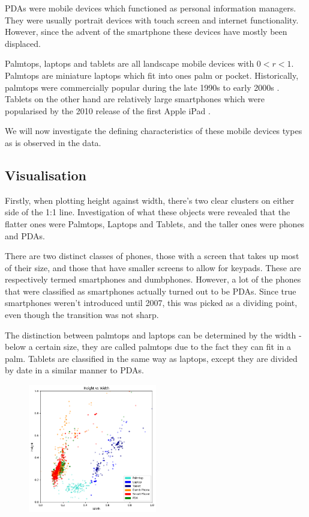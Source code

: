 \documentclass[conference]{IEEEtran}
\begin{document}
PDAs were mobile devices which functioned as personal information managers. They
were usually portrait devices with touch screen and internet functionality.
However, since the advent of the smartphone these devices have mostly been
displaced.

Palmtops, laptops and tablets are all landscape mobile devices with $0<r<1$.
Palmtops are miniature laptops which fit into ones palm or pocket. Historically,
palmtops were commercially popular during the late 1990s to early 2000s
\cite{palm}.
Tablets on the other hand are relatively large smartphones which were
popularised by the 2010 release of the first Apple iPad \cite{ipad}.

We will now investigate the defining characteristics of these mobile
devices types as is observed in the data.

\subsection{Visualisation} \label{sec:Avisu}

Firstly, when plotting height against width, there's two clear clusters on either side of the 1:1 line. Investigation of what these objects were revealed that the flatter ones were Palmtops, Laptops and Tablets, and the taller ones were phones and PDAs.

There are two distinct classes of phones, those with a screen that takes up most of their size, and those that have smaller screens to allow for keypads. These are respectively termed smartphones and dumbphones. However, a lot of the phones that were classified as smartphones actually turned out to be PDAs. Since true smartphones weren't introduced until 2007, this was picked as a dividing point, even though the transition was not sharp.

The distinction between palmtops and laptops can be determined by the width - below a certain size, they are called palmtops due to the fact they can fit in a palm. Tablets are classified in the same way as laptops, except they are divided by date in a similar manner to PDAs.

\begin{figure}
    \centering
    \includegraphics[width=0.5\textwidth]{../Visualisations/A/HeightvsWidthColour.png}
    \caption{}
    \label{fig:HeightvsWidth}
\end{figure}
\end{document}
